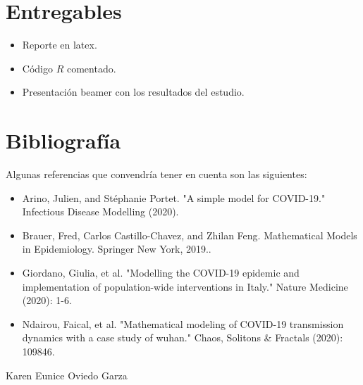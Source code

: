 \documentclass[11pt]{article}
\begin{document}
\section{Entregables}  \label{Entregables}

\begin{itemize}
\item Reporte en latex.
\item C\'odigo $R$ comentado.
\item Presentaci\'on beamer con los resultados del estudio.
\end{itemize}





\section{Bibliograf\'ia}  \label{Bibliografia}

Algunas referencias que convendría tener en cuenta son las siguientes:

\begin{itemize}
\item Arino, Julien, and Stéphanie Portet. "A simple model for COVID-19." Infectious Disease Modelling (2020).

\item  Brauer, Fred, Carlos Castillo-Chavez, and Zhilan Feng. Mathematical Models in Epidemiology. Springer New York, 2019..

\item	Giordano, Giulia, et al. "Modelling the COVID-19 epidemic and implementation of population-wide interventions in Italy." Nature Medicine (2020): 1-6.

\item Ndairou, Faical, et al. "Mathematical modeling of COVID-19 transmission dynamics with a case study of wuhan." Chaos, Solitons \& Fractals (2020): 109846.


\end{itemize}

\bigskip

\bigskip

\bigskip

\bigskip

\bigskip

\underline{\hspace{6cm}}

\hspace{.5cm} Karen Eunice Oviedo Garza
\end{document}

